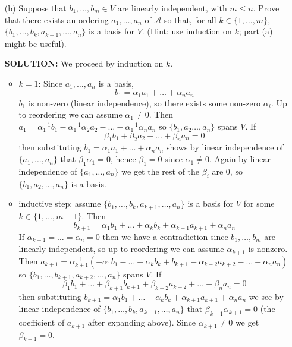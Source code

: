 \documentclass{article}
\begin{document}
\begin{enumerate}
\begin{enumerate}
\item[(b)]
Suppose that $b_1,\ldots,b_m \in V$ are linearly independent, with $m \leq n$.  Prove that there exists an ordering $a_1,\ldots, a_n$ of $\mathcal{A}$ so that, for all $k \in \{1,\ldots,m\}$, $\{b_1,\ldots,b_k, a_{k+1}, \ldots,a_n\}$ is a basis for $V$. (Hint: use induction on $k$; part (a) might be useful).  

\begin{shaded}
\textbf{SOLUTION:}
We proceed by induction on $k$. 
\begin{itemize}
    \item $k = 1$: Since $a_1,\ldots,a_n$ is a basis, 
    \[b_1 = \alpha_1 a_1 + \ldots + \alpha_n a_n\] 
    $b_1$ is non-zero (linear independence), so there exists some non-zero $\alpha_i$. Up to reordering we can assume $\alpha_1 \neq 0$. Then $a_1 = \alpha_1^{-1} b_1 - \alpha_1^{-1} \alpha_2 a_2 - \ldots - \alpha_1^{-1} \alpha_n a_n$ so $\{b_1, a_2 \ldots, a_n\}$ spans $V$. If 
    \[\beta_1 b_1 + \beta_2 a_2 + \ldots + \beta_n a_n = 0\] 
    then substituting $b_1 = \alpha_1 a_1 + \ldots + \alpha_n a_n$ shows by linear independence of $\{a_1,\ldots,a_n\}$ that $\beta_1 \alpha_1 = 0$, hence $\beta_1 = 0$ since $\alpha_1 \neq 0$. Again by linear independence of $\{a_1,\ldots,a_n\}$ we get the rest of the $\beta_i$ are $0$, so $\{b_1,a_2,\ldots,a_n\}$ is a basis.
    \item inductive step: assume $\{b_1,\ldots,b_k, a_{k+1}, \ldots, a_n\}$ is a basis for $V$ for some $k \in \{1, \ldots, m-1\}$. Then 
    \[b_{k+1} = \alpha_1 b_1 + \ldots + \alpha_k b_k + \alpha_{k+1}a_{k+1} + \alpha_n a_n\] 
    If $\alpha_{k+1} = \ldots = \alpha_n = 0$ then we have a contradiction since $b_1,\ldots,b_m$ are linearly independent, so up to reordering we can assume $\alpha_{k+1}$ is nonzero. Then $a_{k+1} = \alpha_{k+1}^{-1}(-\alpha_1 b_1 - \ldots - \alpha_k b_k + b_{k+1} - \alpha_{k+2}a_{k+2} - \ldots - \alpha_n a_n)$ so $\{b_1,\ldots,b_{k+1},a_{k+2}, \ldots, a_n\}$ spans $V$. If 
    \begin{equation}\label{linind}
        \beta_1 b_1 + \ldots + \beta_{k+1} b_{k+1} + \beta_{k+2} a_{k+2} + \ldots + \beta_n a_n = 0
    \end{equation} 
    then substituting $b_{k+1} = \alpha_1 b_1 + \ldots + \alpha_k b_k + \alpha_{k+1}a_{k+1} + \alpha_n a_n$ we see by linear independence of $\{b_1,\ldots,b_k, a_{k+1}, \ldots, a_n\}$ that $\beta_{k+1} \alpha_{k+1} = 0$ (the coefficient of $a_{k+1}$ after expanding above). Since $\alpha_{k+1} \neq 0$ we get $\beta_{k+1} = 0$. 
    

\end{itemize}
\end{shaded}
\end{enumerate}
\end{enumerate}
\end{document}
